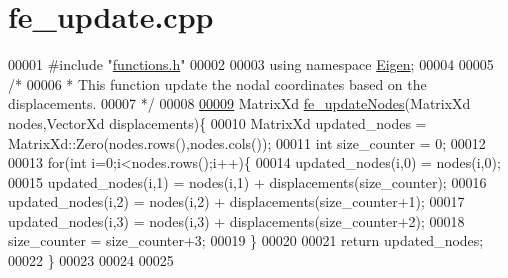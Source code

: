 \hypertarget{fe__update_8cpp_source}{}\section{fe\+\_\+update.\+cpp}
\label{fe__update_8cpp_source}

\begin{DoxyCode}
00001 \textcolor{preprocessor}{#include "\hyperlink{functions_8h}{functions.h}"}
00002 
00003 \textcolor{keyword}{using namespace }\hyperlink{namespace_eigen}{Eigen};
00004 
00005 \textcolor{comment}{/*}
00006 \textcolor{comment}{ * This function update the nodal coordinates based on the displacements.}
00007 \textcolor{comment}{ */}
00008 
\hyperlink{fe__update_8cpp_a81ce693c4400df82b8753f25cc2dcabc}{00009} MatrixXd \hyperlink{fe__update_8cpp_a81ce693c4400df82b8753f25cc2dcabc}{fe\_updateNodes}(MatrixXd nodes,VectorXd displacements)\{
00010     MatrixXd updated\_nodes = MatrixXd::Zero(nodes.rows(),nodes.cols());
00011     \textcolor{keywordtype}{int} size\_counter = 0;
00012 
00013     \textcolor{keywordflow}{for}(\textcolor{keywordtype}{int} i=0;i<nodes.rows();i++)\{
00014             updated\_nodes(i,0) = nodes(i,0);
00015             updated\_nodes(i,1) = nodes(i,1) + displacements(size\_counter);
00016             updated\_nodes(i,2) = nodes(i,2) + displacements(size\_counter+1);
00017             updated\_nodes(i,3) = nodes(i,3) + displacements(size\_counter+2);
00018             size\_counter = size\_counter+3;
00019     \}
00020 
00021     \textcolor{keywordflow}{return} updated\_nodes;
00022 \}
00023 
00024 
00025 
\end{DoxyCode}

